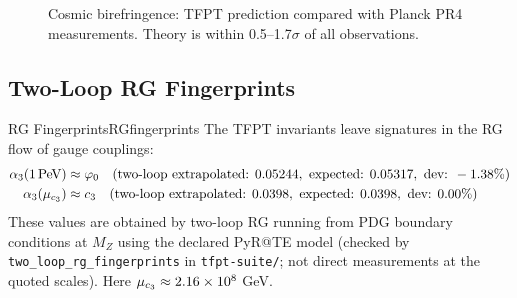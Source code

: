 \begin{figure}[H]
\centering
{}
\caption{Cosmic birefringence: TFPT prediction compared with Planck PR4 
measurements. Theory is within 0.5--1.7$\sigma$ of all observations.}
\label{fig:birefringence}
\end{figure}

\subsection{Two-Loop RG Fingerprints}

\begin{corollary}{RG Fingerprints}{RGfingerprints}
The TFPT invariants leave signatures in the RG flow of gauge couplings:
\begin{align}
    \alpha_3(1\,\text{PeV}) &\approx \varphi_0 \quad 
        \text{(two-loop extrapolated: } 0.05244, \text{ expected: } 0.05317, 
        \text{ dev: } -1.38\%\text{)}\\
    \alpha_3(\mu_{c_3}) &\approx c_3 \quad 
        \text{(two-loop extrapolated: } 0.0398, \text{ expected: } 0.0398, 
        \text{ dev: } 0.00\%\text{)}
\end{align}
These values are obtained by two-loop RG running from PDG boundary conditions at $M_Z$ using the declared PyR@TE model (checked by \texttt{two\_loop\_rg\_fingerprints} in \texttt{tfpt-suite/}; not direct measurements at the quoted scales). Here $\mu_{c_3} \approx 2.16 \times 10^8$ GeV.
\end{corollary}

